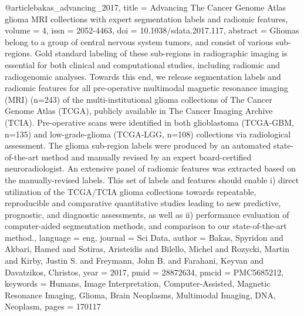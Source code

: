 \documentclass{article}
\begin{document}
@article{bakas_advancing_2017,
	title = {Advancing {The} {Cancer} {Genome} {Atlas} glioma {MRI} collections with expert segmentation labels and radiomic features},
	volume = {4},
	issn = {2052-4463},
	doi = {10.1038/sdata.2017.117},
	abstract = {Gliomas belong to a group of central nervous system tumors, and consist of various sub-regions. Gold standard labeling of these sub-regions in radiographic imaging is essential for both clinical and computational studies, including radiomic and radiogenomic analyses. Towards this end, we release segmentation labels and radiomic features for all pre-operative multimodal magnetic resonance imaging (MRI) (n=243) of the multi-institutional glioma collections of The Cancer Genome Atlas (TCGA), publicly available in The Cancer Imaging Archive (TCIA). Pre-operative scans were identified in both glioblastoma (TCGA-GBM, n=135) and low-grade-glioma (TCGA-LGG, n=108) collections via radiological assessment. The glioma sub-region labels were produced by an automated state-of-the-art method and manually revised by an expert board-certified neuroradiologist. An extensive panel of radiomic features was extracted based on the manually-revised labels. This set of labels and features should enable i) direct utilization of the TCGA/TCIA glioma collections towards repeatable, reproducible and comparative quantitative studies leading to new predictive, prognostic, and diagnostic assessments, as well as ii) performance evaluation of computer-aided segmentation methods, and comparison to our state-of-the-art method.},
	language = {eng},
	journal = {Sci Data},
	author = {Bakas, Spyridon and Akbari, Hamed and Sotiras, Aristeidis and Bilello, Michel and Rozycki, Martin and Kirby, Justin S. and Freymann, John B. and Farahani, Keyvan and Davatzikos, Christos},
	year = {2017},
	pmid = {28872634},
	pmcid = {PMC5685212},
	keywords = {Humans, Image Interpretation, Computer-Assisted, Magnetic Resonance Imaging, Glioma, Brain Neoplasms, Multimodal Imaging, DNA, Neoplasm},
	pages = {170117}
}
\end{document}
